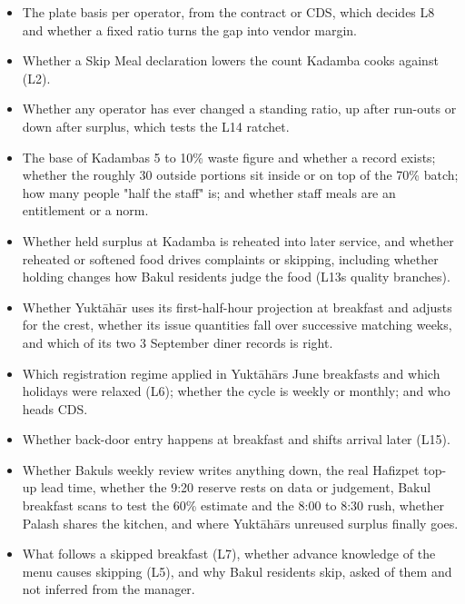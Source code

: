 \documentclass[
  10pt,
  table]{article}
\providecommand{\tightlist}{%
  \setlength{\itemsep}{0pt}\setlength{\parskip}{0pt}}
\renewcommand{\tightlist}{\setlength{\itemsep}{1.5pt}\setlength{\parskip}{0pt}}
\begin{document}
\begin{itemize}
\tightlist
\item
  The plate basis per operator, from the contract or CDS, which decides L8 and whether a fixed ratio turns the gap into vendor margin.
\item
  Whether a Skip Meal declaration lowers the count Kadamba cooks against (L2).
\item
  Whether any operator has ever changed a standing ratio, up after run-outs or down after surplus, which tests the L14 ratchet.
\item
  The base of Kadamba\textquotesingle s 5 to 10\% waste figure and whether a record exists; whether the roughly 30 outside portions sit inside or on top of the 70\% batch; how many people "half the staff" is; and whether staff meals are an entitlement or a norm.
\item
  Whether held surplus at Kadamba is reheated into later service, and whether reheated or softened food drives complaints or skipping, including whether holding changes how Bakul residents judge the food (L13\textquotesingle s quality branches).
\item
  Whether Yuktāhār uses its first-half-hour projection at breakfast and adjusts for the crest, whether its issue quantities fall over successive matching weeks, and which of its two 3 September diner records is right.
\item
  Which registration regime applied in Yuktāhār\textquotesingle s June breakfasts and which holidays were relaxed (L6); whether the cycle is weekly or monthly; and who heads CDS.
\item
  Whether back-door entry happens at breakfast and shifts arrival later (L15).
\item
  Whether Bakul\textquotesingle s weekly review writes anything down, the real Hafizpet top-up lead time, whether the 9:20 reserve rests on data or judgement, Bakul breakfast scans to test the 60\% estimate and the 8:00 to 8:30 rush, whether Palash shares the kitchen, and where Yuktāhār\textquotesingle s unreused surplus finally goes.
\item
  What follows a skipped breakfast (L7), whether advance knowledge of the menu causes skipping (L5), and why Bakul residents skip, asked of them and not inferred from the manager.
\end{itemize}
\end{document}
